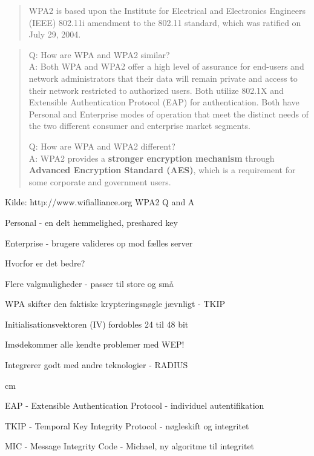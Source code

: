 \documentclass[Screen16to9,17pt]{foils}
\begin{document}

\begin{quote}
WPA2 is based upon the Institute for Electrical and Electronics
Engineers (IEEE) 802.11i amendment to the 802.11 standard, which was
ratified on July 29, 2004.
\end{quote}

\begin{quote}
Q: How are WPA and WPA2 similar?\\
A: Both WPA and WPA2 offer a high level of assurance for end-users and network
administrators that their data will remain private and access to their
network restricted to authorized users.
Both utilize 802.1X and Extensible Authentication Protocol (EAP) for
authentication. Both have Personal and Enterprise modes of operation
that meet the distinct needs of the two different consumer and
enterprise market segments.

Q: How are WPA and WPA2 different?\\
A: WPA2 provides a {\bf stronger encryption mechanism} through {\bf
  Advanced Encryption Standard (AES)}, which is a requirement for some
corporate and government users.
\end{quote}

\centerline{Kilde: http://www.wifialliance.org WPA2 Q and A}


\begin{list1}
\item Personal - en delt hemmelighed, preshared key
\item Enterprise - brugere valideres op mod fælles server
\item Hvorfor er det bedre?
\begin{list2}
\item Flere valgmuligheder - passer til store og små
\item WPA skifter den faktiske krypteringsnøgle jævnligt - TKIP
\item Initialisationsvektoren (IV) fordobles 24 til 48 bit
\item Imødekommer alle kendte problemer med WEP!
\item Integrerer godt med andre teknologier - RADIUS

 cm
\item EAP - Extensible Authentication Protocol - individuel autentifikation
\item TKIP - Temporal Key Integrity Protocol - nøgleskift og integritet
\item MIC - Message Integrity Code - Michael, ny algoritme til integritet
\end{list2}

\end{list1}
\end{document}
